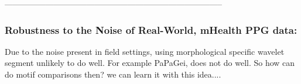 

--------------------------------------------------------------------------------

\subsubsection{Robustness to the Noise of Real-World, mHealth PPG data:}

Due to the noise present in field settings, using morphological specific wavelet segment unlikely to do well. For example PaPaGei, does not do well. So how can do motif comparisons then? we can learn it with this idea....


